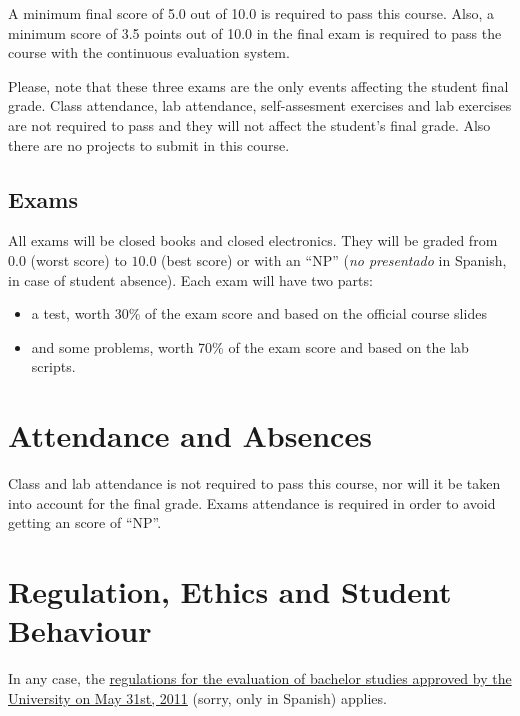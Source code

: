 \documentclass[11pt, a4paper, twoside]{article}
\begin{document}
A minimum final score of 5.0 out of 10.0 is required to pass this course. Also,
a minimum score of 3.5 points out of 10.0 in the final exam is required to pass
the course with the continuous evaluation system.

Please, note that these three exams are the only events affecting the student
final grade. Class attendance, lab attendance, self-assesment exercises and lab
exercises are not required to pass and they will not affect the student's final
grade. Also there are no projects to submit in this course.

\subsection{Exams}

All exams will be closed books and closed electronics. They will be graded from
$0.0$ (worst score) to $10.0$ (best score) or with an ``NP'' (\emph{no
presentado} in Spanish, in case of student absence). Each exam will have two
parts:

\begin{itemize}

  \item a test, worth 30\% of the exam score and based on the official course
    slides

  \item and some problems, worth 70\% of the exam score and based on the lab
    scripts.

\end{itemize}

\section{Attendance and Absences}

Class and lab attendance is not required to pass this course, nor will it be
taken into account for the final grade. Exams attendance is required in order to avoid getting an score of ``NP''.

\section{Regulation, Ethics and Student Behaviour}

In any case, the
\href{http://www.uc3m.es/portal/page/portal/organizacion/secret_general/normativa/estudiantes/estudios_grado/normativa-evaluacion-continua-31-05-11_FINALx.pdf}{regulations
for the evaluation of bachelor studies approved by the University on May 31st,
2011} (sorry, only in Spanish) applies.
\end{document}
